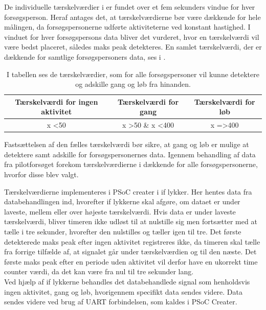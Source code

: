 De individuelle tærskelværdier i  er fundet over et fem sekunders vindue for hver forsøgsperson. Heraf antages det, at tærskelværdierne bør være dækkende for hele målingen, da forsøgspersonerne udførte aktiviteterne ved konstant hastighed. I vinduet for hver forsøgspersons data bliver det vurderet, hvor en tærskelværdi vil være bedst placeret, således maks peak detekteres. En samlet tærskelværdi, der er dækkende for samtlige forsøgspersoners data, ses i .
\begin{table}[H]
	\centering
	\begin{tabular}{ccc}
		\hline
		\rowcolor[HTML]{C0C0C0} 
		Tærskelværdi for ingen aktivitet & Tærskelværdi for gang & Tærskelværdi for løb \\ \hline
		x \textless 50 & x \textgreater 50 \& x \textless 400 & x =\textgreater 400 \\ \hline
	\end{tabular}
	\caption{I tabellen ses de tærskelværdier, som for alle forsøgspersoner vil kunne detektere og adskille gang og løb fra hinanden.}
	\label{tab:faelles_taerskel}
\end{table}\vspace{-0.5cm}
Fastsættelsen af den fælles tærskelværdi bør sikre, at gang og løb er mulige at detektere samt adskille for forsøgspersonernes data. Igennem behandling af data fra pilotforsøget forekom tærskelværdierne i  dækkende for alle forsøgspersonerne, hvorfor disse blev valgt.

Tærskelværdierne implementeres i PSoC creater i if lykker. Her hentes data fra databehandlingen ind, hvorefter if lykkerne skal afgøre, om dataet er under laveste, mellem eller over højeste tærskelværdi. Hvis data er under laveste tærskelværdi, bliver timeren ikke udløst til at nulstille sig men fortsætter med at tælle i tre sekunder, hvorefter den nulstilles og tæller igen til tre. Det første detekterede maks peak efter ingen aktivitet registreres ikke, da timeren skal tælle fra forrige tilfælde af, at signalet går under tærskelværdien og til den næste. Det første maks peak efter en periode uden aktivitet vil derfor have en ukorrekt time counter værdi, da det kan være fra nul til tre sekunder lang. \\%
Ved hjælp af if lykkerne behandles det databehandlede signal som henholdsvis ingen aktivitet, gang og løb, hvorigennem specifikt data sendes videre. Data sendes videre ved brug af UART forbindelsen, som kaldes i PSoC Creater.

